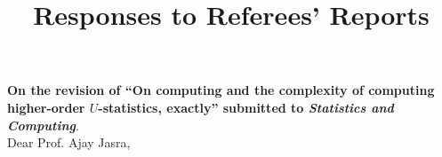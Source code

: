 \documentclass[12pt]{article}
\begin{document}
\title{Responses to Referees' Reports}
\date{}
\author{}
\maketitle

\vspace{-4em}


\textbf{On the revision of ``On computing and the complexity of
computing higher-order $U$-statistics, exactly'' submitted to \emph{Statistics and Computing}}. \\

Dear Prof. Ajay Jasra, \\
\end{document}
